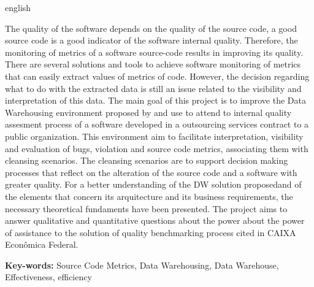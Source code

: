 \begin{resumo}[Abstract]
 \begin{otherlanguage*}{english}
 
The quality of the software depends on the quality of the source code, a good source code is a good indicator of the software internal quality. Therefore, the monitoring of metrics of a software source-code results in improving its quality. There are several solutions and tools to achieve software monitoring of metrics that can easily extract values of metrics of code. However, the decision regarding what to do with the extracted data is still an issue related to the visibility and interpretation of this data. The main goal of this project is to improve the  Data Warehousing environment proposed by    and use to attend to internal quality assesment process of a software developed in a outsourcing services contract to a public organization. This environment aim to facilitate interpretation, visibility and evaluation of bugs, violation and source code metrics, associating them with cleansing scenarios. The cleansing scenarios are to support decision making processes that reflect on the alteration of the source code and a software with greater quality. For a better understanding of the DW solution proposedand of the elements that concern its arquitecture and its business requirements, the necessary theoretical fundaments have been presented. The project aims to answer qualitative and quantitative questions about the power about the power of
assistance to the solution of quality benchmarking process cited in CAIXA Econômica Federal.
 
\textbf{Key-words:} Source Code Metrics,  Data Warehousing, Data Warehouse, Effectiveness, 	 efficiency

 \end{otherlanguage*}
\end{resumo}